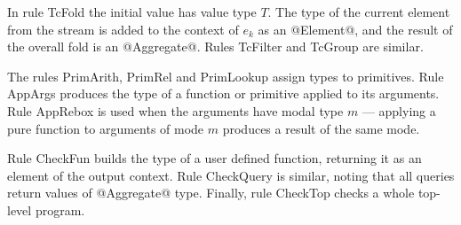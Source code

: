 In rule TcFold the initial value has value type $T$. The type of the current element from the stream is added to the context of $e_k$ as an @Element@, and the result of the overall fold is an @Aggregate@. Rules TcFilter and TcGroup are similar.



The rules PrimArith, PrimRel and PrimLookup assign types to primitives. Rule AppArgs produces the type of a function or primitive applied to its arguments. Rule AppRebox is used when the arguments have modal type $m$ --- applying a pure function to arguments of mode $m$ produces a result of the same mode.

Rule CheckFun builds the type of a user defined function, returning it as an element of the output context. Rule CheckQuery is similar, noting that all queries return values of @Aggregate@ type. Finally, rule CheckTop checks a whole top-level program.





